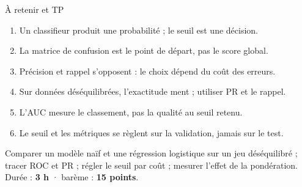 \begin{frame}{À retenir et TP}
\begin{kbox}
\begin{enumerate}
  \item Un classifieur produit une probabilité ; le seuil est une décision.
  \item La matrice de confusion est le point de départ, pas le score global.
  \item Précision et rappel s'opposent : le choix dépend du coût des erreurs.
  \item Sur données déséquilibrées, l'exactitude ment ; utiliser PR et le rappel.
  \item L'AUC mesure le classement, pas la qualité au seuil retenu.
  \item Le seuil et les métriques se règlent sur la validation, jamais sur le test.
\end{enumerate}
\end{kbox}
\vspace{1.5mm}
\begin{abox}
Comparer un modèle naïf et une régression logistique sur un jeu déséquilibré ;
tracer ROC et PR ; régler le seuil par coût ; mesurer l'effet de la pondération.
Durée : \textbf{3 h} · barème : \textbf{15 points}.
\end{abox}
\end{frame}
